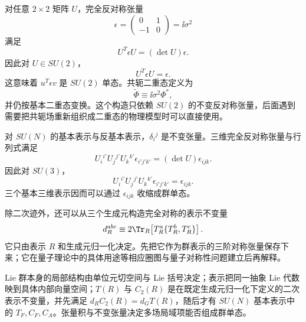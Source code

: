 对任意 $2\times2$ 矩阵 $U$，完全反对称张量
\begin{equation*}
 \epsilon=\begin{pmatrix}0&1\\-1&0\end{pmatrix}=\ii\sigma^2
\end{equation*}
满足
\begin{equation}
 U^T\epsilon U=(\det U)\epsilon.
 \label{eq:2x2-epsilon-det-dp68}
\end{equation}
因此对 $U\in SU(2)$，
\begin{equation}
 {U^T\epsilon U=\epsilon.}
 \label{eq:su2-epsilon-invariance-dp11}
\end{equation}
这意味着 $u^T\epsilon v$ 是 $SU(2)$ 单态。共轭二重态定义为
\begin{equation}
 {\widetilde\Phi\equiv\ii\sigma^2\Phi^*,}
 \label{eq:tilde-higgs-math-dp11}
\end{equation}
并仍按基本二重态变换。这个构造只依赖 $SU(2)$ 的不变反对称张量，后面遇到需要把共轭场重新组织成二重态的物理模型时可以直接使用。

对 $SU(N)$ 的基本表示与反基本表示，$\delta_i{}^j$ 是不变张量。三维完全反对称张量与行列式满足
\begin{equation}
 U_i{}^{i'}U_j{}^{j'}U_k{}^{k'}\epsilon_{i'j'k'}
 =(\det U)\epsilon_{ijk}.
 \label{eq:determinant-epsilon-identity-dp68}
\end{equation}
因此对 $SU(3)$，
\begin{equation}
 {
 U_i{}^{i'}U_j{}^{j'}U_k{}^{k'}\epsilon_{i'j'k'}
 =\epsilon_{ijk}.}
 \label{eq:su3-epsilon-invariant-dp11}
\end{equation}
三个基本三维表示因而可以通过 $\epsilon_{ijk}$ 收缩成群单态。

除二次迹外，还可以从三个生成元构造完全对称的表示不变量
\begin{equation}
 d_R^{abc}
 \equiv2\Tr_R\!\left[T_R^a\{T_R^b,T_R^c\}\right].
 \label{eq:anomaly-symmetric-trace-dp11}
\end{equation}
它只由表示 $R$ 和生成元归一化决定。先把它作为群表示的三阶对称张量保存下来；它在量子理论中的具体用途等相应圈图与量子对称性问题建立后再解释。

Lie 群本身的局部结构由单位元切空间与 Lie 括号决定；表示把同一抽象 Lie 代数映到具体内部向量空间；$T(R)$ 与 $C_2(R)$ 是在既定生成元归一化下定义的二次表示不变量，并先满足 $d_RC_2(R)=d_GT(R)$，随后才有 $SU(N)$ 基本表示中的 $T_F,C_F,C_A$。张量积与不变张量决定多场局域项能否组成群单态。

